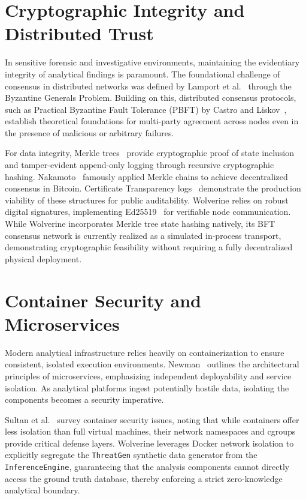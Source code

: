 \section{Cryptographic Integrity and Distributed Trust}
\label{sec:related-cryptographic-trust}
In sensitive forensic and investigative environments, maintaining the evidentiary integrity of analytical findings is paramount. The foundational challenge of consensus in distributed networks was defined by Lamport et al.~\cite{lamport1982byzantine} through the Byzantine Generals Problem. Building on this, distributed consensus protocols, such as Practical Byzantine Fault Tolerance (PBFT) by Castro and Liskov~\cite{castro2002practical}, establish theoretical foundations for multi-party agreement across nodes even in the presence of malicious or arbitrary failures.

For data integrity, Merkle trees~\cite{merkle1987digital} provide cryptographic proof of state inclusion and tamper-evident append-only logging through recursive cryptographic hashing. Nakamoto~\cite{nakamoto2008bitcoin} famously applied Merkle chains to achieve decentralized consensus in Bitcoin. Certificate Transparency logs~\cite{rfc6962} demonstrate the production viability of these structures for public auditability. Wolverine relies on robust digital signatures, implementing Ed25519~\cite{rfc8032} for verifiable node communication. While Wolverine incorporates Merkle tree state hashing natively, its BFT consensus network is currently realized as a simulated in-process transport, demonstrating cryptographic feasibility without requiring a fully decentralized physical deployment.

\section{Container Security and Microservices}
\label{sec:related-container-security}
Modern analytical infrastructure relies heavily on containerization to ensure consistent, isolated execution environments. Newman~\cite{newman2021building} outlines the architectural principles of microservices, emphasizing independent deployability and service isolation. As analytical platforms ingest potentially hostile data, isolating the components becomes a security imperative.

Sultan et al.~\cite{sultan2019container} survey container security issues, noting that while containers offer less isolation than full virtual machines, their network namespaces and cgroups provide critical defense layers. Wolverine leverages Docker network isolation to explicitly segregate the \texttt{ThreatGen} synthetic data generator from the \texttt{InferenceEngine}, guaranteeing that the analysis components cannot directly access the ground truth database, thereby enforcing a strict zero-knowledge analytical boundary.

